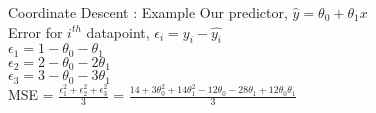 \documentclass{beamer}
\begin{document}
\begin{frame}{Coordinate Descent : Example}
Our predictor, $\hat{y} = \theta_0 + \theta_1x$\\
\vspace{1cm}
Error for $i^{th}$ datapoint, $\epsilon_i = y_i - \hat{y_i}$\\
$\epsilon_1 = 1 - \theta_0 - \theta_1$ \\
$\epsilon_2 = 2 - \theta_0 - 2\theta_1$ \\
$\epsilon_3 = 3 - \theta_0 - 3\theta_1$ \\

\vspace{1cm}
MSE = $\frac{\epsilon_1^2 + \epsilon_2^2 + \epsilon_3^2}{3}$ = $\frac{14 + 3\theta_0^2 + 14\theta_1^2 -12\theta_0 - 28\theta_1 + 12\theta_0\theta_1}{3}$\\
\end{frame}
\end{document}
